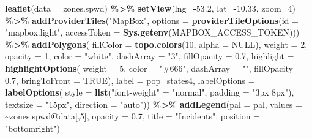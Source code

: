 \documentclass[
]{article}
\newenvironment{Shaded}{\begin{snugshade}}{\end{snugshade}}
\newcommand{\DataTypeTok}[1]{\textcolor[rgb]{0.13,0.29,0.53}{#1}}
\newcommand{\DecValTok}[1]{\textcolor[rgb]{0.00,0.00,0.81}{#1}}
\newcommand{\FloatTok}[1]{\textcolor[rgb]{0.00,0.00,0.81}{#1}}
\newcommand{\KeywordTok}[1]{\textcolor[rgb]{0.13,0.29,0.53}{\textbf{#1}}}
\newcommand{\NormalTok}[1]{#1}
\newcommand{\OperatorTok}[1]{\textcolor[rgb]{0.81,0.36,0.00}{\textbf{#1}}}
\newcommand{\OtherTok}[1]{\textcolor[rgb]{0.56,0.35,0.01}{#1}}
\newcommand{\StringTok}[1]{\textcolor[rgb]{0.31,0.60,0.02}{#1}}
\begin{document}
\begin{Shaded}
\begin{Highlighting}[]
\KeywordTok{leaflet}\NormalTok{(}\DataTypeTok{data =}\NormalTok{ zones.spwd) }\OperatorTok{\%\textgreater{}\%}
\StringTok{        }\KeywordTok{setView}\NormalTok{(}\DataTypeTok{lng=}\OperatorTok{{-}}\FloatTok{53.2}\NormalTok{, }\DataTypeTok{lat=}\OperatorTok{{-}}\FloatTok{10.33}\NormalTok{, }\DataTypeTok{zoom=}\DecValTok{4}\NormalTok{) }\OperatorTok{\%\textgreater{}\%}
\StringTok{        }\KeywordTok{addProviderTiles}\NormalTok{(}\StringTok{"MapBox"}\NormalTok{, }\DataTypeTok{options =} \KeywordTok{providerTileOptions}\NormalTok{(}\DataTypeTok{id =} \StringTok{"mapbox.light"}\NormalTok{,}
                \DataTypeTok{accessToken =} \KeywordTok{Sys.getenv}\NormalTok{(}\StringTok{\textquotesingle{}MAPBOX\_ACCESS\_TOKEN\textquotesingle{}}\NormalTok{))) }\OperatorTok{\%\textgreater{}\%}
\StringTok{        }\KeywordTok{addPolygons}\NormalTok{(}
                \DataTypeTok{fillColor =} \KeywordTok{topo.colors}\NormalTok{(}\DecValTok{10}\NormalTok{, }\DataTypeTok{alpha =} \OtherTok{NULL}\NormalTok{),}
                \DataTypeTok{weight =} \DecValTok{2}\NormalTok{,}
                \DataTypeTok{opacity =} \DecValTok{1}\NormalTok{,}
                \DataTypeTok{color =} \StringTok{"white"}\NormalTok{,}
                \DataTypeTok{dashArray =} \StringTok{"3"}\NormalTok{,}
                \DataTypeTok{fillOpacity =} \FloatTok{0.7}\NormalTok{,}
                \DataTypeTok{highlight =} \KeywordTok{highlightOptions}\NormalTok{(}
                        \DataTypeTok{weight =} \DecValTok{5}\NormalTok{,}
                        \DataTypeTok{color =} \StringTok{"\#666"}\NormalTok{,}
                        \DataTypeTok{dashArray =} \StringTok{""}\NormalTok{,}
                        \DataTypeTok{fillOpacity =} \FloatTok{0.7}\NormalTok{,}
                        \DataTypeTok{bringToFront =} \OtherTok{TRUE}\NormalTok{),}
                \DataTypeTok{label =}\NormalTok{ pop\_states4,}
                \DataTypeTok{labelOptions =} \KeywordTok{labelOptions}\NormalTok{(}
                        \DataTypeTok{style =} \KeywordTok{list}\NormalTok{(}\StringTok{"font{-}weight"}\NormalTok{ =}\StringTok{ "normal"}\NormalTok{, }\DataTypeTok{padding =} \StringTok{"3px 8px"}\NormalTok{),}
                        \DataTypeTok{textsize =} \StringTok{"15px"}\NormalTok{,}
                        \DataTypeTok{direction =} \StringTok{"auto"}\NormalTok{)) }\OperatorTok{\%\textgreater{}\%}
\StringTok{        }\KeywordTok{addLegend}\NormalTok{(}\DataTypeTok{pal =}\NormalTok{ pal, }\DataTypeTok{values =} \OperatorTok{\textasciitilde{}}\NormalTok{zones.spwd}\OperatorTok{@}\NormalTok{data[,}\DecValTok{5}\NormalTok{], }\DataTypeTok{opacity =} \FloatTok{0.7}\NormalTok{, }\DataTypeTok{title =} \StringTok{"Incidents"}\NormalTok{, }\DataTypeTok{position =} \StringTok{"bottomright"}\NormalTok{)}
\end{Highlighting}
\end{Shaded}
\end{document}
